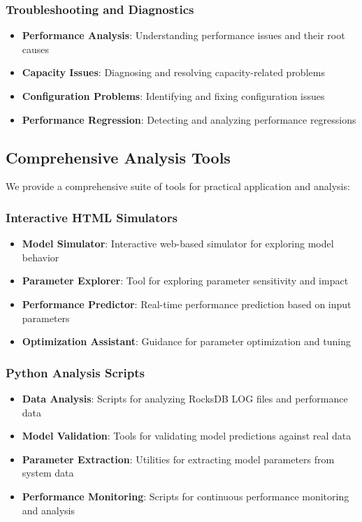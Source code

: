 \documentclass[11pt]{article}
\begin{document}
\subsubsection{Troubleshooting and Diagnostics}
\begin{itemize}
    \item \textbf{Performance Analysis}: Understanding performance issues and their root causes
    \item \textbf{Capacity Issues}: Diagnosing and resolving capacity-related problems
    \item \textbf{Configuration Problems}: Identifying and fixing configuration issues
    \item \textbf{Performance Regression}: Detecting and analyzing performance regressions
\end{itemize}

\subsection{Comprehensive Analysis Tools}

We provide a comprehensive suite of tools for practical application and analysis:

\subsubsection{Interactive HTML Simulators}
\begin{itemize}
    \item \textbf{Model Simulator}: Interactive web-based simulator for exploring model behavior
    \item \textbf{Parameter Explorer}: Tool for exploring parameter sensitivity and impact
    \item \textbf{Performance Predictor}: Real-time performance prediction based on input parameters
    \item \textbf{Optimization Assistant}: Guidance for parameter optimization and tuning
\end{itemize}

\subsubsection{Python Analysis Scripts}
\begin{itemize}
    \item \textbf{Data Analysis}: Scripts for analyzing RocksDB LOG files and performance data
    \item \textbf{Model Validation}: Tools for validating model predictions against real data
    \item \textbf{Parameter Extraction}: Utilities for extracting model parameters from system data
    \item \textbf{Performance Monitoring}: Scripts for continuous performance monitoring and analysis
\end{itemize}
\end{document}
